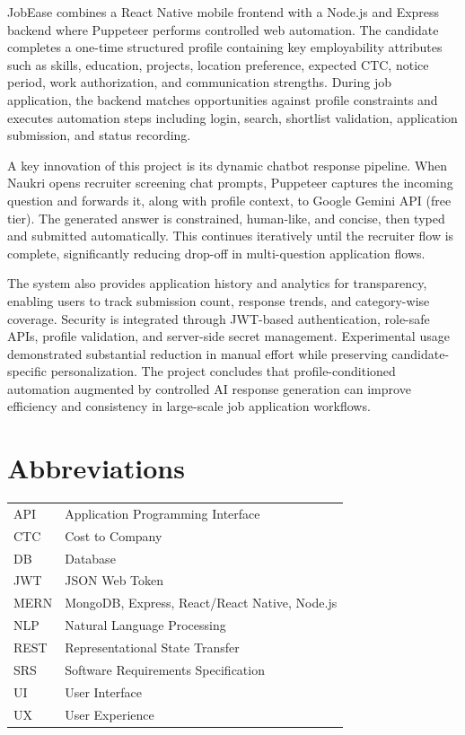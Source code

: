 \documentclass[12pt,a4paper,oneside]{report}
\begin{document}
JobEase combines a React Native mobile frontend with a Node.js and Express backend where Puppeteer performs controlled web automation. The candidate completes a one-time structured profile containing key employability attributes such as skills, education, projects, location preference, expected CTC, notice period, work authorization, and communication strengths. During job application, the backend matches opportunities against profile constraints and executes automation steps including login, search, shortlist validation, application submission, and status recording.

A key innovation of this project is its dynamic chatbot response pipeline. When Naukri opens recruiter screening chat prompts, Puppeteer captures the incoming question and forwards it, along with profile context, to Google Gemini API (free tier). The generated answer is constrained, human-like, and concise, then typed and submitted automatically. This continues iteratively until the recruiter flow is complete, significantly reducing drop-off in multi-question application flows.

The system also provides application history and analytics for transparency, enabling users to track submission count, response trends, and category-wise coverage. Security is integrated through JWT-based authentication, role-safe APIs, profile validation, and server-side secret management. Experimental usage demonstrated substantial reduction in manual effort while preserving candidate-specific personalization. The project concludes that profile-conditioned automation augmented by controlled AI response generation can improve efficiency and consistency in large-scale job application workflows.

\tableofcontents
\listoftables
\listoffigures

\chapter*{Abbreviations}
\begin{longtable}{p{}p{}}
API & Application Programming Interface \\
CTC & Cost to Company \\
DB & Database \\
JWT & JSON Web Token \\
MERN & MongoDB, Express, React/React Native, Node.js \\
NLP & Natural Language Processing \\
REST & Representational State Transfer \\
SRS & Software Requirements Specification \\
UI & User Interface \\
UX & User Experience \\
\end{longtable}
\end{document}
